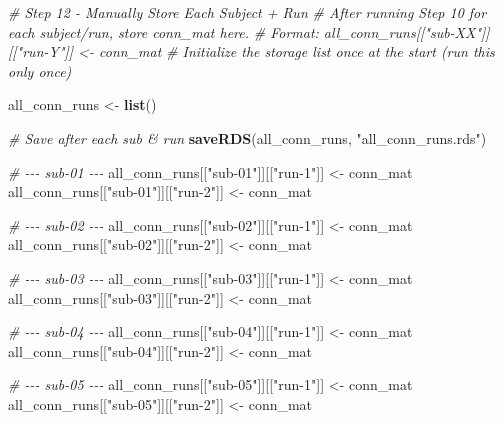 \documentclass[
]{article}
\newenvironment{Shaded}{\begin{snugshade}}{\end{snugshade}}
\newcommand{\CommentTok}[1]{\textcolor[rgb]{0.56,0.35,0.01}{\textit{#1}}}
\newcommand{\FunctionTok}[1]{\textcolor[rgb]{0.13,0.29,0.53}{\textbf{#1}}}
\newcommand{\NormalTok}[1]{#1}
\newcommand{\OtherTok}[1]{\textcolor[rgb]{0.56,0.35,0.01}{#1}}
\newcommand{\StringTok}[1]{\textcolor[rgb]{0.31,0.60,0.02}{#1}}
\begin{document}
\begin{Shaded}
\begin{Highlighting}[]
\CommentTok{\# Step 12 {-} Manually Store Each Subject + Run }
\CommentTok{\# After running Step 10 for each subject/run, store conn\_mat here.}
\CommentTok{\# Format: all\_conn\_runs[["sub{-}XX"]][["run{-}Y"]] \textless{}{-} conn\_mat}
\CommentTok{\# Initialize the storage list once at the start (run this only once)}

\NormalTok{all\_conn\_runs }\OtherTok{\textless{}{-}} \FunctionTok{list}\NormalTok{() }

\CommentTok{\# Save after each sub \& run}
\FunctionTok{saveRDS}\NormalTok{(all\_conn\_runs, }\StringTok{"all\_conn\_runs.rds"}\NormalTok{)}

\CommentTok{\# {-}{-}{-} sub{-}01 {-}{-}{-}}
\NormalTok{all\_conn\_runs[[}\StringTok{"sub{-}01"}\NormalTok{]][[}\StringTok{"run{-}1"}\NormalTok{]] }\OtherTok{\textless{}{-}}\NormalTok{ conn\_mat}
\NormalTok{all\_conn\_runs[[}\StringTok{"sub{-}01"}\NormalTok{]][[}\StringTok{"run{-}2"}\NormalTok{]] }\OtherTok{\textless{}{-}}\NormalTok{ conn\_mat}

\CommentTok{\# {-}{-}{-} sub{-}02 {-}{-}{-}}
\NormalTok{all\_conn\_runs[[}\StringTok{"sub{-}02"}\NormalTok{]][[}\StringTok{"run{-}1"}\NormalTok{]] }\OtherTok{\textless{}{-}}\NormalTok{ conn\_mat}
\NormalTok{all\_conn\_runs[[}\StringTok{"sub{-}02"}\NormalTok{]][[}\StringTok{"run{-}2"}\NormalTok{]] }\OtherTok{\textless{}{-}}\NormalTok{ conn\_mat}

\CommentTok{\# {-}{-}{-} sub{-}03 {-}{-}{-}}
\NormalTok{all\_conn\_runs[[}\StringTok{"sub{-}03"}\NormalTok{]][[}\StringTok{"run{-}1"}\NormalTok{]] }\OtherTok{\textless{}{-}}\NormalTok{ conn\_mat}
\NormalTok{all\_conn\_runs[[}\StringTok{"sub{-}03"}\NormalTok{]][[}\StringTok{"run{-}2"}\NormalTok{]] }\OtherTok{\textless{}{-}}\NormalTok{ conn\_mat}

\CommentTok{\# {-}{-}{-} sub{-}04 {-}{-}{-}}
\NormalTok{all\_conn\_runs[[}\StringTok{"sub{-}04"}\NormalTok{]][[}\StringTok{"run{-}1"}\NormalTok{]] }\OtherTok{\textless{}{-}}\NormalTok{ conn\_mat}
\NormalTok{all\_conn\_runs[[}\StringTok{"sub{-}04"}\NormalTok{]][[}\StringTok{"run{-}2"}\NormalTok{]] }\OtherTok{\textless{}{-}}\NormalTok{ conn\_mat}

\CommentTok{\# {-}{-}{-} sub{-}05 {-}{-}{-}}
\NormalTok{all\_conn\_runs[[}\StringTok{"sub{-}05"}\NormalTok{]][[}\StringTok{"run{-}1"}\NormalTok{]] }\OtherTok{\textless{}{-}}\NormalTok{ conn\_mat}
\NormalTok{all\_conn\_runs[[}\StringTok{"sub{-}05"}\NormalTok{]][[}\StringTok{"run{-}2"}\NormalTok{]] }\OtherTok{\textless{}{-}}\NormalTok{ conn\_mat}


\end{Highlighting}
\end{Shaded}
\end{document}
